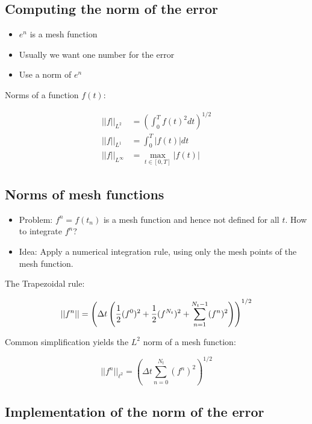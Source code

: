 \documentclass[%
oneside,                 %
final,                   %
10pt]{article}
\begin{document}
\noindent



\subsection*{Computing the norm of the error}
\label{decay:computing:error:norm}

\begin{itemize}
 \item $e^n$ is a mesh function

 \item Usually we want one number for the error

 \item Use a norm of $e^n$
\end{itemize}

\noindent
Norms of a function $f(t)$:

\begin{align}
||f||_{L^2} &= \left( \int_0^T f(t)^2 dt\right)^{1/2}
\label{decay:norms:L2}\\ 
||f||_{L^1} &= \int_0^T |f(t)| dt
\label{decay:norms:L1}\\ 
||f||_{L^\infty} &= \max_{t\in [0,T]}|f(t)|
\label{decay:norms:Linf}
\end{align}

\subsection*{Norms of mesh functions}

\begin{itemize}
 \item Problem: $f^n =f(t_n)$ is a mesh function and hence not defined for all $t$.
   How to integrate $f^n$?

 \item Idea: Apply a numerical integration rule, using only
   the mesh points of the mesh function.
\end{itemize}

\noindent
The Trapezoidal rule:

\[ ||f^n|| = \left(\Delta t\left(\half(f^0)^2 + \half(f^{N_t})^2
+ \sum_{n=1}^{N_t-1} (f^n)^2\right)\right)^{1/2} \]

Common simplification yields the $L^2$ norm of a mesh function:

\[ ||f^n||_{\ell^2} = \left(\Delta t\sum_{n=0}^{N_t} (f^n)^2\right)^{1/2}\]


\subsection*{Implementation of the norm of the error}
\end{document}
